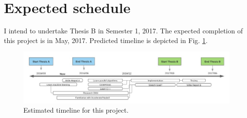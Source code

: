 \section{Expected schedule} \label{se:schedule}

I intend to undertake Thesis B in Semester 1, 2017. The expected completion of this project is in May, 2017. Predicted timeline is depicted in Fig. \ref{fig:timeline}.

\begin{figure}
  \centerline{\includegraphics[width=\linewidth]{timeline.jpg}}
  \caption{Estimated timeline for this project.}
  \label{fig:timeline}
\end{figure}